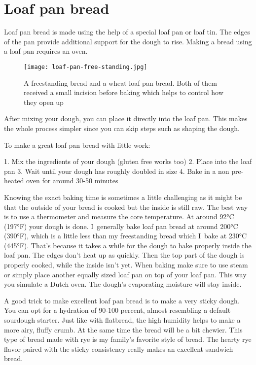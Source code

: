 \section{Loaf pan bread}

Loaf pan bread is made using the help of a special loaf pan
or loaf tin. The edges of the pan provide additional support
for the dough to rise. Making a bread using a loaf pan requires
an oven.

\begin{figure}[!htb]
  \texttt{[image: loaf-pan-free-standing.jpg]}
  \caption{A freestanding bread and a wheat loaf pan bread. Both of them
  received a small incision before baking which helps to control how they open up}
  \label{fig:free-standing-loaf-pan}
\end{figure}

After mixing your dough, you can place it directly into the loaf pan.
This makes the whole process simpler since you can skip steps such
as shaping the dough.

To make a great loaf pan bread with little work:

1. Mix the ingredients of your dough (gluten free works too)
2. Place into the loaf pan
3. Wait until your dough has roughly doubled in size
4. Bake in a non pre-heated oven for around 30-50 minutes

Knowing the exact baking time is sometimes a little challenging
as it might be that the outside of your bread is cooked but
the inside is still raw. The best way is to use a thermometer
and measure the core temperature. At around 92°C (197°F) your
dough is done. I~generally bake loaf pan bread at around 200°C (390°F),
which is a little less than my freestanding bread which I~bake
at 230°C (445°F). That's because it takes a while for the dough
to bake properly inside the loaf pan. The edges don't heat up
as quickly. Then the top part of the dough is properly cooked, while
the inside isn't yet. When baking make sure to use steam
or simply place another equally sized loaf pan on top
of your loaf pan. This way you simulate a Dutch oven. The dough's
evaporating moisture will stay inside.

A good trick to make excellent loaf pan bread is to make a very
sticky dough. You can opt for a hydration of 90-100 percent, almost
resembling a default sourdough starter. Just like with flatbread,
the high humidity helps to make a more airy, fluffy crumb. At
the same time the bread will be a bit chewier. This
type of bread made with rye is my family's favorite style of bread.
The hearty rye flavor paired with the sticky consistency really
makes an excellent sandwich bread.

